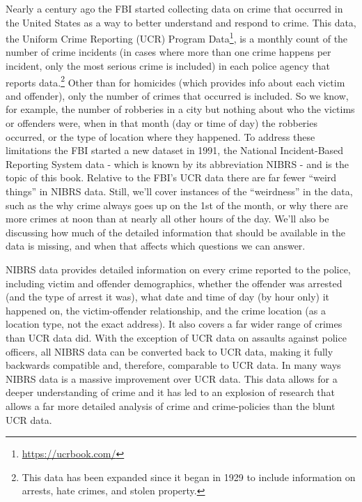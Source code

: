 \documentclass[
]{krantz}
\renewcommand{\href}[2]{#2\footnote{\url{#1}}}
\begin{document}
Nearly a century ago the FBI started collecting data on
crime that occurred in the United States as a way to better
understand and respond to crime. This data, the
\href{https://ucrbook.com/}{Uniform Crime Reporting (UCR)
Program Data}, is a monthly count of the number of crime
incidents (in cases where more than one crime happens per
incident, only the most serious crime is included) in each
police agency that reports data.\footnote{This data has been
  expanded since it began in 1929 to include information on
  arrests, hate crimes, and stolen property.} Other than for
homicides (which provides info about each victim and
offender), only the number of crimes that occurred is
included. So we know, for example, the number of robberies
in a city but nothing about who the victims or offenders
were, when in that month (day or time of day) the robberies
occurred, or the type of location where they happened. To
address these limitations the FBI started a new dataset in
1991, the National Incident-Based Reporting System data -
which is known by its abbreviation NIBRS - and is the topic
of this book. Relative to the FBI's UCR data there are far
fewer ``weird things'' in NIBRS data. Still, we'll cover
instances of the ``weirdness'' in the data, such as the why
crime always goes up on the 1st of the month, or why there
are more crimes at noon than at nearly all other hours of
the day. We'll also be discussing how much of the detailed
information that should be available in the data is missing,
and when that affects which questions we can answer.

NIBRS data provides detailed information on every crime
reported to the police, including victim and offender
demographics, whether the offender was arrested (and the
type of arrest it was), what date and time of day (by hour
only) it happened on, the victim-offender relationship, and
the crime location (as a location type, not the exact
address). It also covers a far wider range of crimes than
UCR data did. With the exception of UCR data on assaults
against police officers, all NIBRS data can be converted
back to UCR data, making it fully backwards compatible and,
therefore, comparable to UCR data. In many ways NIBRS data
is a massive improvement over UCR data. This data allows for
a deeper understanding of crime and it has led to an
explosion of research that allows a far more detailed
analysis of crime and crime-policies than the blunt UCR
data.
\end{document}
